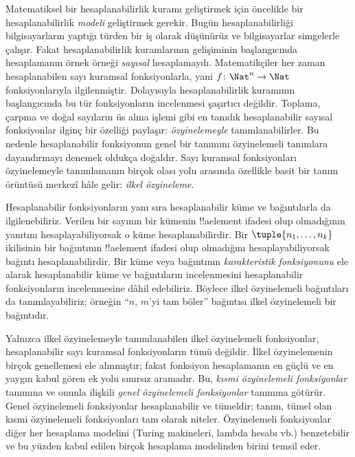 


Matematiksel bir hesaplanabilirlik kuramı geliştirmek için öncelikle
bir hesaplanabilirlik \emph{modeli} geliştirmek gerekir. Bugün
hesaplanabilirliği bilgisayarların yaptığı türden bir iş olarak
düşünürüz ve bilgisayarlar simgelerle çalışır. Fakat hesaplanabilirlik
kuramlarının gelişiminin başlangıcında hesaplamanın örnek örneği
\emph{sayısal} hesaplamaydı. Matematikçiler her zaman hesaplanabilen
sayı kuramsal fonksiyonlarla, yani $f\colon\Nat^n\to\Nat$
fonksiyonlarıyla ilgilenmiştir. Dolayısıyla hesaplanabilirlik kuramının
başlangıcında bu tür fonksiyonların incelenmesi şaşırtıcı değildir.
Toplama, çarpma ve doğal sayıların üs alma işlemi gibi en tanıdık
hesaplanabilir sayısal fonksiyonlar ilginç bir özelliği paylaşır:
\emph{özyinelemeyle} tanımlanabilirler. Bu nedenle hesaplanabilir
fonksiyonun genel bir tanımını özyinelemeli tanımlara dayandırmayı
denemek oldukça doğaldır. Sayı kuramsal fonksiyonları özyinelemeyle
tanımlamanın birçok olası yolu arasında özellikle basit bir tanım
örüntüsü merkezî hâle gelir: \emph{ilkel özyineleme}.

Hesaplanabilir fonksiyonların yanı sıra hesaplanabilir küme ve
bağıntılarla da ilgilenebiliriz. Verilen bir sayının bir kümenin
!!a{element} ifadesi olup olmadığının yanıtını hesaplayabiliyorsak o
küme hesaplanabilirdir. Bir $\tuple{n_1,\dots,n_k}$ ikilisinin bir
bağıntının !!a{element} ifadesi olup olmadığını hesaplayabiliyorsak
bağıntı hesaplanabilirdir. Bir küme veya bağıntının \emph{karakteristik
fonksiyonunu} ele alarak hesaplanabilir küme ve bağıntıların
incelenmesini hesaplanabilir fonksiyonların incelenmesine dâhil
edebiliriz. Böylece ilkel özyinelemeli bağıntıları da tanımlayabiliriz;
örneğin ``$n$, $m$'yi tam böler'' bağıntısı ilkel özyinelemeli bir
bağıntıdır.

Yalnızca ilkel özyinelemeyle tanımlanabilen ilkel özyinelemeli
fonksiyonlar, hesaplanabilir sayı kuramsal fonksiyonların tümü değildir.
İlkel özyinelemenin birçok genellemesi ele alınmıştır; fakat fonksiyon
hesaplamanın en güçlü ve en yaygın kabul gören ek yolu sınırsız
aramadır. Bu, \emph{kısmi özyinelemeli fonksiyonlar} tanımına ve onunla
ilişkili \emph{genel özyinelemeli fonksiyonlar} tanımına götürür. Genel
özyinelemeli fonksiyonlar hesaplanabilir ve tümeldir; tanım, tümel olan
kısmi özyinelemeli fonksiyonları tam olarak niteler. Özyinelemeli
fonksiyonlar diğer her hesaplama modelini (Turing makineleri, lambda
hesabı vb.) benzetebilir ve bu yüzden kabul edilen birçok hesaplama
modelinden birini temsil eder.


